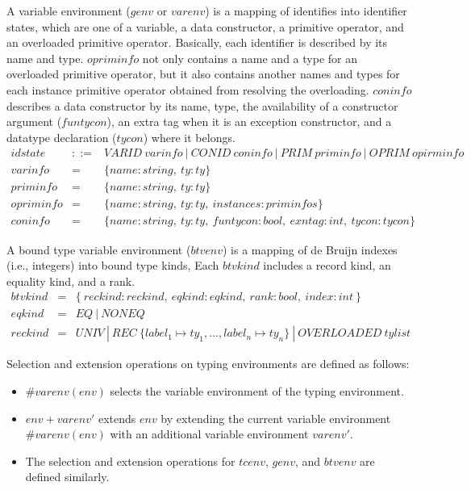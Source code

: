 \documentclass{article}
\newcommand{\env}    {env}
\newcommand{\tcenv}  {tcenv}
\newcommand{\genv}   {genv}
\newcommand{\btvenv} {btvenv}
\newcommand{\varenv} {varenv}
\newcommand{\select}[2] {\# #2(#1)}
\newcommand{\extendop} {+}
\newcommand{\extend}[2] {#1 \extendop  #2}
\newcommand{\ty}       {ty}
\newcommand{\tys}      {tylist}
\begin{document}
A variable environment ($\genv$ or $\varenv$) is a mapping of
identifies into identifier states, which are one of a variable, a data
constructor, a primitive operator, and an overloaded primitive
operator. Basically, each identifier is described by its name and
type.  $opriminfo$ not only contains a name and a type for an
overloaded primitive operator, but it also contains another names and
types for each instance primitive operator obtained from resolving the
overloading.  $coninfo$ describes a data constructor by its name,
type, the availability of a constructor argument ($funtycon$), an
extra tag when it is an exception constructor, and a datatype
declaration ($tycon$) where it belongs.
\begin{eqnarray*}
idstate & ::= & VARID \ varinfo \ | \ 
CONID \ coninfo \ | \
PRIM \ priminfo \ | \
OPRIM \ opirminfo
\\
varinfo & = & \{ name:string, \ ty : \ty \}
\\
priminfo & = & \{ name:string, \ ty : \ty \}
\\
opriminfo & = & \{ name:string, \ ty : \ty, \ instances : priminfos \}
\\
coninfo & = & \{ name:string, \ ty : \ty, \ funtycon : bool, \ exntag
: int, \ tycon : tycon \}
\end{eqnarray*}

A bound type variable environment ($\btvenv$) is a mapping of de
Bruijn indexes (i.e., integers) into bound type kinds, Each $btvkind$
includes a record kind, an equality kind, and a rank.
\begin{eqnarray*}
btvkind & = & \{ \ reckind:reckind, \ eqkind:eqkind, \ rank:bool, \ index:int \ \}
\\
eqkind  & = & EQ \ | \ NONEQ
\\
reckind & = & UNIV \ | \ REC \ \{ label_1\mapsto\ty_1 , ... , label_n\mapsto\ty_n\} \ | \ OVERLOADED \ \tys
\end{eqnarray*}

Selection and extension operations on typing environments are defined
as follows:
\begin{itemize}
\item $\select{\env}{\varenv}$ selects the variable environment of the
typing environment.
\item $\extend{\env}{\varenv'}$ extends $\env$ by extending the
current variable environment $\select{\env}{\varenv}$ with an
additional variable environment $\varenv'$.
\item The selection and extension operations for $\tcenv$, $\genv$,
and $\btvenv$ are defined similarly.
\end{itemize}
\end{document}

